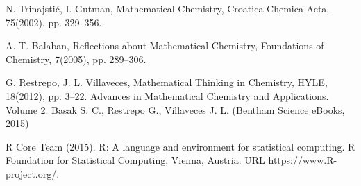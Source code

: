 
\begin{thebibliography}{00}

N. Trinajstić, I. Gutman, 
\newblock Mathematical Chemistry, 
\newblock Croatica Chemica Acta, 75(2002), pp. 329–356.

A. T. Balaban, 
\newblock Reflections about Mathematical Chemistry, 
\newblock Foundations of Chemistry, 7(2005), pp. 289–306.

G. Restrepo, J. L. Villaveces, 
\newblock Mathematical Thinking in Chemistry, HYLE, 18(2012), pp. 3–22.
\newblock Advances in Mathematical Chemistry and Applications. Volume 2. Basak S. C., Restrepo G., Villaveces J. L. (Bentham Science eBooks, 2015)

R Core Team (2015). 
\newblock R: A language and environment for statistical computing. R Foundation for Statistical Computing, Vienna, Austria.
\newblock URL https://www.R-project.org/.

\end{thebibliography}

